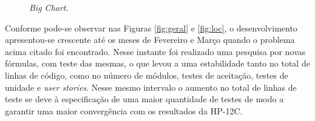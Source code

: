 \begin{figure}[!h]
\centering
{}
 \caption{\it Big Chart.} \label{fig:bigchart}
\end{figure}

Conforme pode-se observar nas Figuras \ref{fig:geral} e \ref{fig:loc}, o desenvolvimento apresentou-se crescente
 até os meses de Fevereiro e Março quando o problema acima citado foi encontrado. Nesse instante foi 
realizado uma pesquisa por novas fórmulas, com teste das mesmas, o que levou a uma estabilidade tanto no 
total de linhas de código, como no número de módulos, testes de aceitação, testes de unidade e 
\textit{user stories}. Nesse mesmo intervalo o aumento no total de linhas de teste se deve à especificação
 de uma maior quantidade de testes de modo a garantir uma maior convergência com os resultados da HP-12C.

